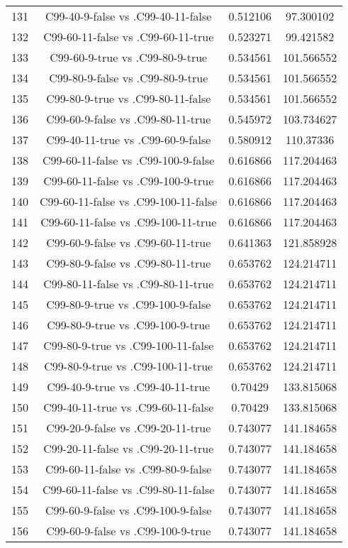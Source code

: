 \documentclass[a4paper,10pt]{article}
\begin{document}
\begin{landscape}
\begin{table}[!htp]
\begin{tabular}{cccc}
131&C99-40-9-false vs .C99-40-11-false&0.512106&97.300102\\
132&C99-60-11-false vs .C99-60-11-true&0.523271&99.421582\\
133&C99-60-9-true vs .C99-80-9-true&0.534561&101.566552\\
134&C99-80-9-false vs .C99-80-9-true&0.534561&101.566552\\
135&C99-80-9-true vs .C99-80-11-false&0.534561&101.566552\\
136&C99-60-9-false vs .C99-80-11-true&0.545972&103.734627\\
137&C99-40-11-true vs .C99-60-9-false&0.580912&110.37336\\
138&C99-60-11-false vs .C99-100-9-false&0.616866&117.204463\\
139&C99-60-11-false vs .C99-100-9-true&0.616866&117.204463\\
140&C99-60-11-false vs .C99-100-11-false&0.616866&117.204463\\
141&C99-60-11-false vs .C99-100-11-true&0.616866&117.204463\\
142&C99-60-9-false vs .C99-60-11-true&0.641363&121.858928\\
143&C99-80-9-false vs .C99-80-11-true&0.653762&124.214711\\
144&C99-80-11-false vs .C99-80-11-true&0.653762&124.214711\\
145&C99-80-9-true vs .C99-100-9-false&0.653762&124.214711\\
146&C99-80-9-true vs .C99-100-9-true&0.653762&124.214711\\
147&C99-80-9-true vs .C99-100-11-false&0.653762&124.214711\\
148&C99-80-9-true vs .C99-100-11-true&0.653762&124.214711\\
149&C99-40-9-true vs .C99-40-11-true&0.70429&133.815068\\
150&C99-40-11-true vs .C99-60-11-false&0.70429&133.815068\\
151&C99-20-9-false vs .C99-20-11-true&0.743077&141.184658\\
152&C99-20-11-false vs .C99-20-11-true&0.743077&141.184658\\
153&C99-60-11-false vs .C99-80-9-false&0.743077&141.184658\\
154&C99-60-11-false vs .C99-80-11-false&0.743077&141.184658\\
155&C99-60-9-false vs .C99-100-9-false&0.743077&141.184658\\
156&C99-60-9-false vs .C99-100-9-true&0.743077&141.184658\\

\end{tabular}
\end{table}
\end{landscape}
\end{document}
